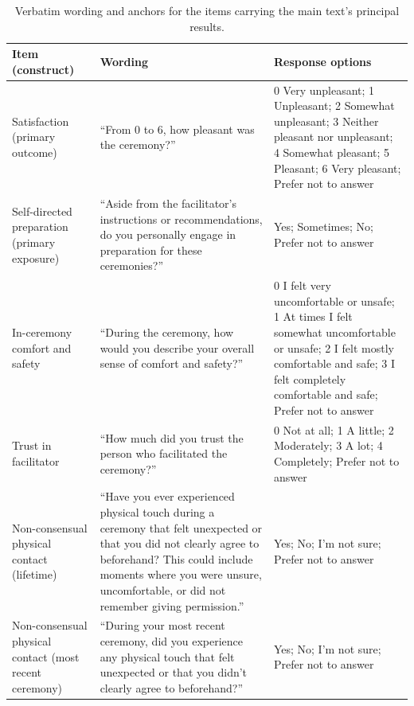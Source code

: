 \documentclass[12pt]{article}
\begin{document}
\begin{table}[htbp]
\centering
\caption{Verbatim wording and anchors for the items carrying the main text's principal results.}
\begin{tabular}{p{3cm}p{6cm}p{5cm}}
\toprule
Item (construct) & Wording & Response options \\
\midrule
Satisfaction \newline (primary outcome) &
``From 0 to 6, how pleasant was the ceremony?'' &
0 Very unpleasant; 1 Unpleasant; 2 Somewhat unpleasant; 3 Neither pleasant nor unpleasant; 4 Somewhat
pleasant; 5 Pleasant; 6 Very pleasant; Prefer not to answer \\
\addlinespace
Self-directed preparation \newline (primary exposure) &
``Aside from the facilitator's instructions or recommendations, do you personally engage in preparation for
these ceremonies?'' &
Yes; Sometimes; No; Prefer not to answer \\
\addlinespace
In-ceremony comfort and safety &
``During the ceremony, how would you describe your overall sense of comfort and safety?'' &
0 I felt very uncomfortable or unsafe; 1 At times I felt somewhat uncomfortable or unsafe; 2 I felt mostly
comfortable and safe; 3 I felt completely comfortable and safe; Prefer not to answer \\
\addlinespace
Trust in facilitator &
``How much did you trust the person who facilitated the ceremony?'' &
0 Not at all; 1 A little; 2 Moderately; 3 A lot; 4 Completely; Prefer not to answer \\
\addlinespace
Non-consensual physical contact \newline (lifetime) &
``Have you ever experienced physical touch during a ceremony that felt unexpected or that you did not
clearly agree to beforehand? This could include moments where you were unsure, uncomfortable, or did not
remember giving permission.'' &
Yes; No; I'm not sure; Prefer not to answer \\
\addlinespace
Non-consensual physical contact \newline (most recent ceremony) &
``During your most recent ceremony, did you experience any physical touch that felt unexpected or that you
didn't clearly agree to beforehand?'' &
Yes; No; I'm not sure; Prefer not to answer \\
\bottomrule
\end{tabular}
\end{table}
\end{document}
